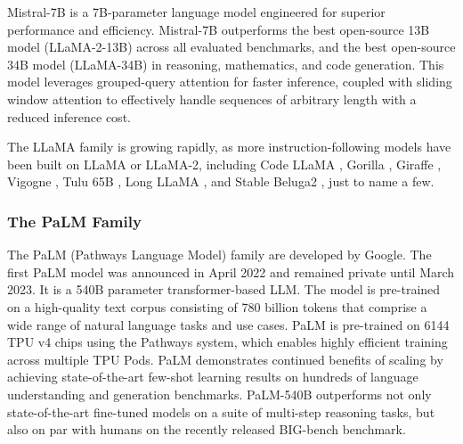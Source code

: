 \documentclass[conference]{IEEEtran}
\begin{document}

Mistral-7B \cite{jiang2023mistral} is a 7B-parameter language model engineered for superior performance and efficiency. Mistral-7B outperforms the best open-source 13B model (LLaMA-2-13B) across all evaluated benchmarks, and the best open-source 34B model (LLaMA-34B) in reasoning, mathematics, and code generation. This model leverages grouped-query attention for faster inference, coupled with sliding window attention to effectively handle sequences of arbitrary length with a
reduced inference cost.

The LLaMA family is growing rapidly, as more instruction-following models have been built on LLaMA or LLaMA-2, including
Code LLaMA \cite{roziere2023code}, Gorilla \cite{patil2023gorilla}, Giraffe \cite{pal2023giraffe}, Vigogne \cite{vigogne}, Tulu 65B \cite{wang2023far}, Long LLaMA \cite{tworkowski2023focused}, and Stable Beluga2 \cite{StableBelugaModels}, just to name a few. 


\subsubsection{\textbf{The PaLM Family}}
The PaLM (Pathways Language Model) family are developed by Google. 
The first PaLM model \cite{chowdhery2022palm} was announced in April 2022 and remained private until March 2023. It is a 540B parameter transformer-based LLM.
The model is pre-trained on a high-quality text corpus consisting of 780 billion tokens that comprise a wide range of natural language tasks and use cases.
PaLM is pre-trained on 6144 TPU v4 chips using the Pathways system, which enables highly efficient training across multiple TPU Pods. 
PaLM demonstrates continued benefits of scaling by achieving state-of-the-art few-shot learning results on hundreds of language understanding and generation benchmarks. 
PaLM-540B outperforms not only state-of-the-art fine-tuned models on a suite of multi-step reasoning tasks, but also on par with humans on the recently released BIG-bench benchmark.
\end{document}
